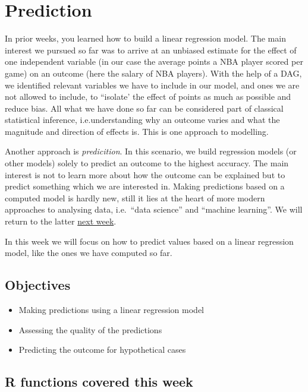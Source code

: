\documentclass[
]{book}
\providecommand{\tightlist}{%
  \setlength{\itemsep}{0pt}\setlength{\parskip}{0pt}}
\begin{document}
\hypertarget{pm-t}{%
\chapter{Prediction}\label{pm-t}}

In prior weeks, you learned how to build a linear regression model. The main
interest we pursued so far was to arrive at an unbiased estimate for the effect
of one independent variable (in our case the average points a NBA player scored
per game) on an outcome (here the salary of NBA players).
With the help of a DAG, we identified relevant variables we have to include in
our model, and ones we are not allowed to include, to ``isolate' the effect of
points as much as possible and reduce bias.
All what we have done so far can be considered part of classical statistical
inference, i.e.understanding why an outcome varies and what the magnitude and
direction of effects is.
This is one approach to modelling.

Another approach is \emph{predicition}.
In this scenario, we build regression models (or other models) solely to predict
an outcome to the highest accuracy. The main interest is not to learn more about
how the outcome can be explained but to predict something which we are
interested in.
Making predictions based on a computed model is hardly new, still it
lies at the heart of more modern approaches to analysing data, i.e.~``data
science'' and ``machine learning''. We will return to the latter \protect\hyperlink{ml}{next week}.

In this week we will focus on how to predict values based on a linear regression
model, like the ones we have computed so far.

\hypertarget{objectives-6}{%
\section{Objectives}\label{objectives-6}}

\begin{itemize}
\tightlist
\item
  Making predictions using a linear regression model
\item
  Assessing the quality of the predictions
\item
  Predicting the outcome for hypothetical cases
\end{itemize}

\hypertarget{r-functions-covered-this-week-2}{%
\section{R functions covered this week}\label{r-functions-covered-this-week-2}}
\end{document}
